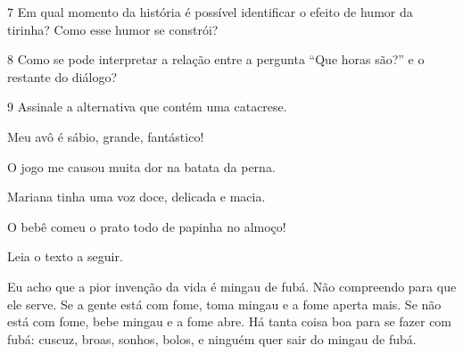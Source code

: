 \num{7} Em qual momento da história é possível identificar o efeito de
humor da tirinha? Como esse humor se constrói?


\num{8} Como se pode interpretar a relação entre a pergunta ``Que horas
são?'' e o restante do diálogo?


\num{9} Assinale a alternativa que contém uma catacrese.

\begin{escolha}
\item Meu avô é sábio, grande, fantástico!
\item O jogo me causou muita dor na batata da perna.
\item Mariana tinha uma voz doce, delicada e macia.
\item O bebê comeu o prato todo de papinha no almoço!
\end{escolha}


Leia o texto a seguir.

\begin{myquote}
Eu acho que a pior invenção da vida é mingau de fubá. Não compreendo
para que ele serve. Se a gente está com fome, toma mingau e a fome
aperta mais. Se não está com fome, bebe mingau e a fome abre. Há tanta
coisa boa para se fazer com fubá: cuscuz, broas, sonhos, bolos, e
ninguém quer sair do mingau de fubá.

\end{myquote}

